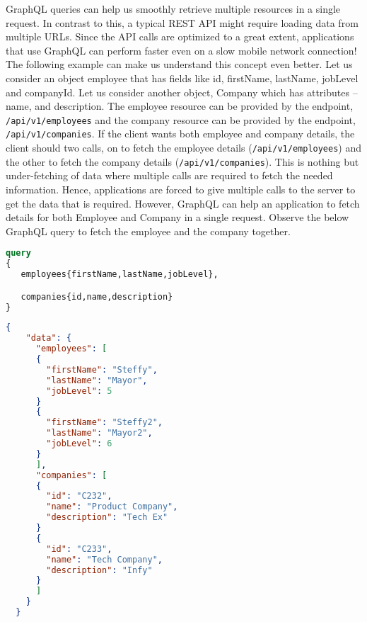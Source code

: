\documentclass[../main.tex]{subfiles}
\begin{document}
GraphQL queries can help us smoothly retrieve multiple resources in a single request. In contrast to this, a typical REST API might require loading data from multiple URLs.
Since the API calls are optimized to a great extent, applications that use GraphQL can perform faster even on a slow mobile network connection!
The following example can make us understand this concept even better.
Let us consider an object employee that has fields like id, firstName, lastName, jobLevel and companyId.
Let us consider another object, Company which has attributes – name, and description.
The employee resource can be provided by the endpoint, \lstinline{/api/v1/employees} and the company resource can be provided by the endpoint, \lstinline{/api/v1/companies}.
If the client wants both employee and company details, the client should two calls, on to fetch the employee details (\lstinline{/api/v1/employees}) and the other to fetch the company details (\lstinline{/api/v1/companies}).
This is nothing but under-fetching of data where multiple calls are required to fetch the needed information. Hence, applications are forced to give multiple calls to the server to get the data that is required.
However, GraphQL can help an application to fetch details for both Employee and Company in a single request.
Observe the below GraphQL query to fetch the employee and the company together.
\begin{lstlisting}[language=GraphQL, label={lst:fetch-multiple-resource-in-single-query}, caption={fetch multiple resource in single query}]
query
{
   employees{firstName,lastName,jobLevel},

   companies{id,name,description}
}

\end{lstlisting}

\begin{lstlisting}[language=json, label={lst:fetch-multiple-resource-in-single-query-response}, caption={fetch multiple resource in single query response}]
  {
    "data": {
      "employees": [
      {
        "firstName": "Steffy",
        "lastName": "Mayor",
        "jobLevel": 5
      }
      {
        "firstName": "Steffy2",
        "lastName": "Mayor2",
        "jobLevel": 6
      }
      ],
      "companies": [
      {
        "id": "C232",
        "name": "Product Company",
        "description": "Tech Ex"
      }
      {
        "id": "C233",
        "name": "Tech Company",
        "description": "Infy"
      }
      ]
    }
  }
\end{lstlisting}
\end{document}
